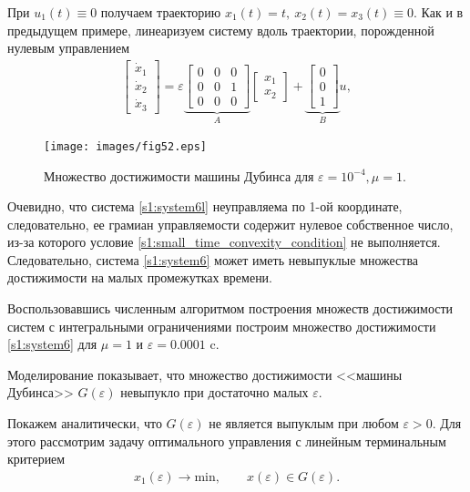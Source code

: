 \documentclass[../main.tex]{subfiles}
\begin{document}
При $ u_1(t) \equiv 0 $ получаем траекторию $ x_1(t) = t, \ x_2(t) = x_3(t) \equiv 0 $.
Как и в предыдущем примере, линеаризуем систему вдоль траектории, порожденной нулевым управлением
\begin{gather}\label{s1:system6l}
 \begin{bmatrix}
 \dot{x}_1\\
 \dot{x}_2\\
 \dot{x}_3
 \end{bmatrix}
 = 
 \varepsilon \underbrace {\begin{bmatrix}
 0&0&0\\
 0&0&1\\
 0&0&0
 \end{bmatrix}}_A
 \begin{bmatrix}
 x_1\\
 x_2
 \end{bmatrix}
 + 
 \underbrace {\begin{bmatrix}
 0\\
 0\\
 1
 \end{bmatrix}}_B u,
\end{gather}
\begin{figure}[h]
 \centering
 \texttt{[image: images/fig52.eps]}
 \caption{Множество достижимости машины Дубинса для $\varepsilon = 10^{-4}, \mu = 1$.}
\end{figure}
Очевидно, что система \eqref{s1:system6l} неуправляема по 1-ой координате, следовательно, ее грамиан управляемости содержит нулевое собственное число, из-за которого условие \eqref{s1:small_time_convexity_condition} не выполняется.
Следовательно, система \eqref{s1:system6} может иметь невыпуклые множества достижимости на малых промежутках времени.
 
Воспользовавшись численным алгоритмом построения множеств достижимости систем с интегральными ограничениями \cite{GusevZykov2018} построим множество достижимости \eqref{s1:system6} для $ \mu = 1 $ и $ \varepsilon = 0.0001 $ c. 
 
Моделирование показывает, что множество достижимости <<машины Дубинса>> $G(\varepsilon)$ невыпукло при достаточно малых $ \varepsilon $.

Покажем аналитически, что $G(\varepsilon)$ не является выпуклым при любом $\varepsilon >0$.
Для этого рассмотрим задачу оптимального управления с линейным терминальным критерием
\begin{gather}\label{s1:opt_problem}
	x_1(\varepsilon) \rightarrow \mathrm{min}, \qquad
	x(\varepsilon) \in G(\varepsilon).
\end{gather}
\end{document}

